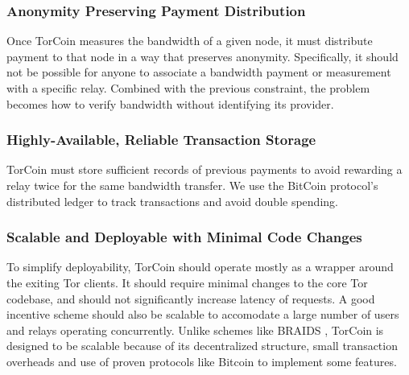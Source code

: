 \subsubsection{Anonymity Preserving Payment Distribution} Once TorCoin measures
the bandwidth of a given node, it must distribute payment to that node in a way
that preserves anonymity. Specifically, it should not be possible for anyone to
associate a bandwidth payment or measurement with a specific relay. Combined
with the previous constraint, the problem becomes how to verify bandwidth
without identifying its provider.

\subsubsection{Highly-Available, Reliable Transaction Storage} TorCoin must store
sufficient records of previous payments to avoid rewarding a relay twice for the
same bandwidth transfer. We use the BitCoin protocol's distributed ledger 
to track transactions and avoid double spending.

\subsubsection{Scalable and Deployable with Minimal Code Changes} To simplify deployability,
TorCoin should operate mostly as a wrapper around the exiting Tor clients. It should
require minimal changes to the core Tor codebase, and should not significantly
increase latency of requests. A good incentive scheme should also be scalable to
accomodate a large number of users and relays operating concurrently. Unlike schemes
like BRAIDS \cite{ccs10-braids}, TorCoin is designed to be scalable because of its
decentralized structure, small transaction overheads and use of proven protocols 
like Bitcoin to implement some features. 





